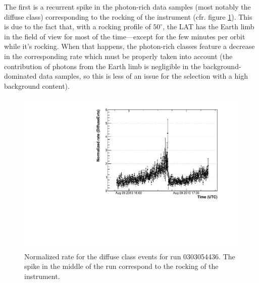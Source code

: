 \documentclass[a4paper,twocolumn]{article}
\begin{document}
The first is a recurrent spike in the photon-rich data samples (most notably
the diffuse class) corresponding to the rocking of the instrument
(cfr. figure \ref{DiffuseEvts_old}).
This is due to the fact that, with a rocking profile of $50^\circ$, the LAT
has the Earth limb in the field of view for most of the time---except for the
few minutes per orbit while it's rocking. When that happens, the photon-rich
classes feature a decrease in the corresponding rate which must be properly
taken into account (the contribution of photons from the Earth limb is
negligible in the background-dominated data samples, so this is less of an
issue for the selection with a high background content).
\begin{figure}[htb!]
  \begin{center}
    \includegraphics[width=\linewidth]{figures/DiffuseEvts_old}
    \caption{Normalized rate for the diffuse class events for run 0303054436.
      The spike in the middle of the run correspond to the rocking of the
      instrument.}
    \label{DiffuseEvts_old}
  \end{center}
\end{figure}
\end{document}
